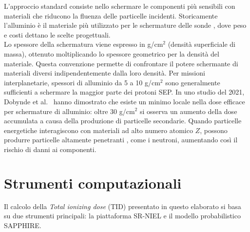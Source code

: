 \documentclass[12pt]{report}
\begin{document}
L'approccio standard consiste nello schermare le componenti più sensibili con materiali che riducono la fluenza delle particelle incidenti. Storicamente l'alluminio è il materiale più utilizzato per le schermature delle sonde \cite{Badavi2009}, dove peso e costi dettano le scelte progettuali.\\
Lo spessore della schermatura viene espresso in g/cm$^2$ (densità superficiale di massa), ottenuto moltiplicando lo spessore geometrico per la densità del materiale. Questa convenzione permette di confrontare il potere schermante di materiali diversi indipendentemente dalla loro densità. Per missioni interplanetarie, spessori di alluminio da 5 a 10 g/cm$^2$ sono generalmente sufficienti a schermare la maggior parte dei protoni SEP. In uno studio del 2021, Dobynde et al.\ \cite{Optimal_shielding} hanno dimostrato che esiste un minimo locale nella dose efficace per schermature di alluminio: oltre 30 g/cm$^2$ si osserva un aumento della dose accumulata a causa della produzione di particelle secondarie. Quando particelle energetiche interagiscono con materiali ad alto numero atomico $Z$, possono produrre particelle altamente penetranti \cite{Gudowska2002}, come i neutroni, aumentando così il rischio di danni ai componenti.

\clearpage
\section{Strumenti computazionali}
Il calcolo della \textit{Total ionizing dose} (TID) presentato in questo elaborato si basa su due strumenti principali: la piattaforma SR-NIEL e il modello probabilistico SAPPHIRE.\\
\end{document}
